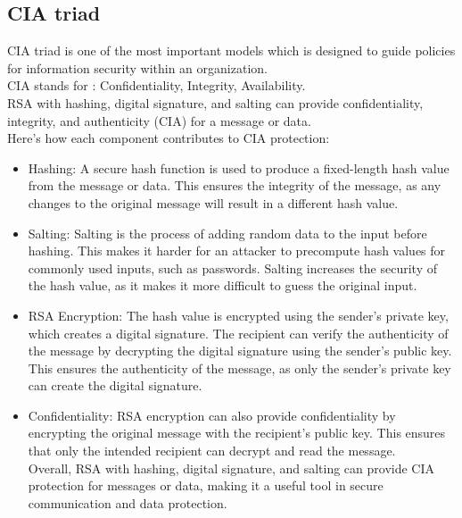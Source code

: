 \subsection{CIA triad}
CIA triad is one of the most important models which is designed to guide policies
for information security within an organization.\\
CIA stands for :
Confidentiality,
Integrity,
Availability.\\
RSA with hashing, digital signature, and salting can provide confidentiality, integrity, and authenticity (CIA) for a message or data. \\
Here's how each component contributes to CIA protection:
\begin{itemize}
	\item Hashing: A secure hash function is used to produce a fixed-length hash value from the message or data.
	      This ensures the integrity of the message, as any changes to the original message will result in a different hash value.
	\item Salting: Salting is the process of adding random data to the input before hashing.
	      This makes it harder for an attacker to precompute hash values for commonly used inputs, such as passwords.
	      Salting increases the security of the hash value, as it makes it more difficult to guess the original input.
	\item RSA Encryption: The hash value is encrypted using the sender's private key, which creates a digital signature.
	      The recipient can verify the authenticity of the message by decrypting the digital signature using the sender's public key.
	      This ensures the authenticity of the message, as only the sender's private key can create the digital signature.
	\item Confidentiality: RSA encryption can also provide confidentiality by encrypting the original message with the recipient's public key.
	      This ensures that only the intended recipient can decrypt and read the message.\\

	      Overall, RSA with hashing, digital signature, and salting can provide CIA protection for messages or data, making it a useful tool in secure communication and data protection.
\end{itemize}







\pagebreak







